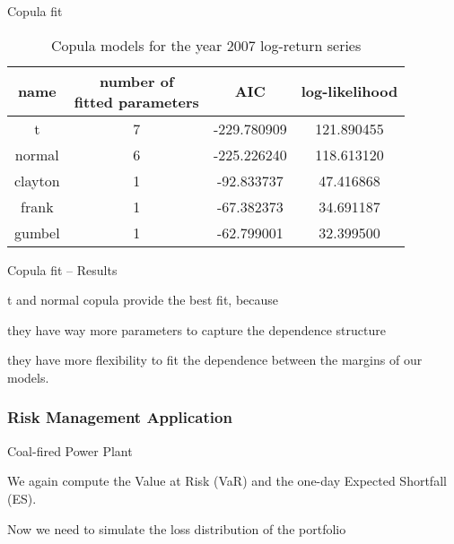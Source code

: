 


{Copula fit}

\begin{table}[ht]
            \vspace{0.5cm}
            \begin{center}
                \begin{tabular}{c|c|c|c}
                    name&\parbox{3cm}{\centering number of\\ fitted parameters}&AIC&log-likelihood\\\hline
                    t&7&-229.780909&121.890455\\
                    normal&6&-225.226240&118.613120\\
                    clayton&1&-92.833737&47.416868\\
                    frank&1&-67.382373&34.691187\\
                    gumbel&1&-62.799001&32.399500\\
                \end{tabular}
                \caption{Copula models for the year 2007 log-return series}
            \end{center}
        \end{table}

{Copula fit -- Results}

t and normal copula provide the best fit,  because






	they have way more parameters to capture the dependence
structure

	they have more flexibility to fit the dependence
between the margins of our models.





\subsubsection{Risk Management Application}

{Coal-fired Power Plant}

We again compute the Value at Risk (VaR) and the one-day Expected
Shortfall (ES).

Now we need to simulate the loss distribution of the portfolio







